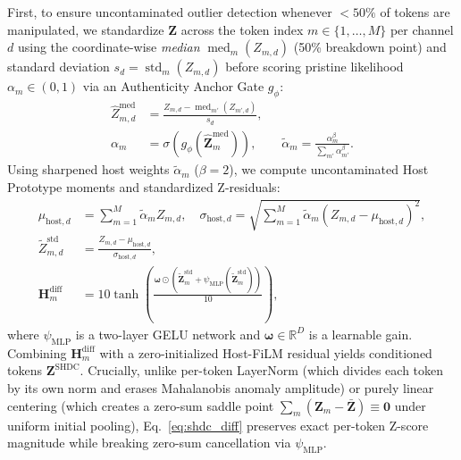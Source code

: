 \documentclass[10pt,twocolumn]{article}
\begin{document}
First, to ensure uncontaminated outlier detection whenever $<50\%$ of tokens are manipulated, we standardize $\mathbf{Z}$ across the token index $m \in \{1,\dots,M\}$ per channel $d$ using the coordinate-wise \emph{median} $\operatorname{med}_m(Z_{m,d})$ (50\% breakdown point) and standard deviation $s_d = \operatorname{std}_m(Z_{m,d})$ before scoring pristine likelihood $\alpha_m \in (0,1)$ via an Authenticity Anchor Gate $g_\phi$:
\begin{align}
    \hat{Z}_{m,d}^{\text{med}} &= \frac{Z_{m,d} - \operatorname{med}_{m'}(Z_{m',d})}{s_d}, \label{eq:anchor}\\
    \alpha_m &= \sigma\!\left(g_\phi(\hat{\mathbf{Z}}_m^{\text{med}})\right), \qquad \tilde{\alpha}_m = \frac{\alpha_m^\beta}{\sum_{m'} \alpha_{m'}^\beta}. \nonumber
\end{align}
Using sharpened host weights $\tilde{\alpha}_m$ ($\beta=2$), we compute uncontaminated Host Prototype moments and standardized Z-residuals:
\begin{align}
    \mu_{\text{host},d} &= \sum_{m=1}^M \tilde{\alpha}_m Z_{m,d}, \quad \sigma_{\text{host},d} = \sqrt{\sum_{m=1}^M \tilde{\alpha}_m (Z_{m,d} - \mu_{\text{host},d})^2}, \label{eq:moments}\\
    \tilde{Z}_{m,d}^{\text{std}} &= \frac{Z_{m,d} - \mu_{\text{host},d}}{\sigma_{\text{host},d}}, \nonumber\\
    \mathbf{H}_m^{\text{diff}} &= 10\tanh\!\left(\frac{\boldsymbol{\omega} \odot (\tilde{\mathbf{Z}}_m^{\text{std}} + \psi_{\text{MLP}}(\tilde{\mathbf{Z}}_m^{\text{std}}))}{10}\right), \label{eq:shdc_diff}
\end{align}
where $\psi_{\text{MLP}}$ is a two-layer GELU network and $\boldsymbol{\omega} \in \mathbb{R}^D$ is a learnable gain. Combining $\mathbf{H}_m^{\text{diff}}$ with a zero-initialized Host-FiLM residual yields conditioned tokens $\mathbf{Z}^{\text{SHDC}}$. Crucially, unlike per-token LayerNorm (which divides each token by its own norm and erases Mahalanobis anomaly amplitude) or purely linear centering (which creates a zero-sum saddle point $\sum_m (\mathbf{Z}_m - \bar{\mathbf{Z}}) \equiv \mathbf{0}$ under uniform initial pooling), Eq.~\eqref{eq:shdc_diff} preserves exact per-token Z-score magnitude while breaking zero-sum cancellation via $\psi_{\text{MLP}}$.
\end{document}
